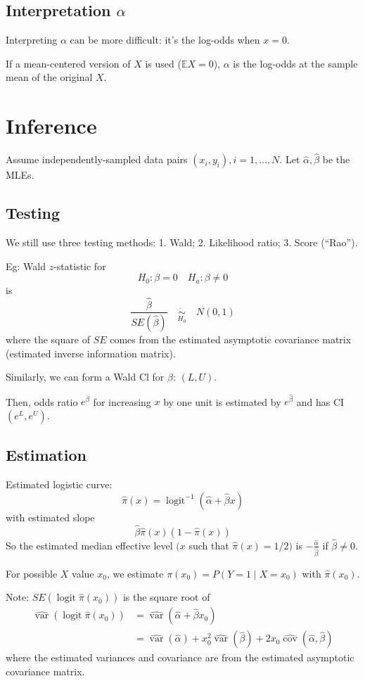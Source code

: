 \documentclass[11pt]{elegantbook}
\begin{document}
\subsection{Interpretation $\alpha$}
Interpreting $\alpha$ can be more difficult: it's the log-odds when $x = 0$.

If a mean-centered version of $X$ is used ($\mathbb{E}X=0$), $\alpha$ is the log-odds at the sample mean of the original $X$.

\section{Inference}
Assume independently-sampled data pairs $(x_i,y_i), i=1,...,N$. Let $\hat{\alpha},\hat{\beta}$ be the MLEs.

\subsection{Testing}
We still use three testing methods: 1. Wald; 2. Likelihood ratio; 3. Score (“Rao”).

Eg: Wald $z$-statistic for
$$
H_0: \beta=0 \quad H_a: \beta \neq 0
$$
is
$$
\frac{\hat{\beta}}{S E(\hat{\beta})}\quad \underset{H_0}{\dot{\sim}}\quad N(0,1)
$$
where the square of $S E$ comes from the estimated asymptotic covariance matrix (estimated inverse information matrix).

Similarly, we can form a Wald $\mathrm{Cl}$ for $\beta$: $(L,U)$.

Then, odds ratio $e^\beta$ for increasing $x$ by one unit is estimated by $e^{\hat{\beta}}$ and has CI $(e^L,e^U)$.

\subsection{Estimation}
Estimated logistic curve:
$$
\hat{\pi}(x)=\operatorname{logit}^{-1}(\hat{\alpha}+\hat{\beta} x)
$$
with estimated slope
$$
\hat{\beta} \hat{\pi}(x)(1-\hat{\pi}(x))
$$
So the estimated median effective level $(x$ such that $\hat{\pi}(x)=1 / 2)$ is $-\frac{\hat{\alpha}}{\hat{\beta}}$ if $\hat{\beta} \neq 0$.

For possible $X$ value $x_0$, we estimate $\pi(x_0)=P(Y=1\mid X=x_0)$ with $\hat{\pi}(x_0)$.

Note: $S E\left(\operatorname{logit} \hat{\pi}\left(x_0\right)\right)$ is the square root of
$$
\begin{aligned}
\widehat{\operatorname{var}}\left(\operatorname{logit} \hat{\pi}\left(x_0\right)\right) & =\widehat{\operatorname{var}}\left(\hat{\alpha}+\hat{\beta} x_0\right) \\
& =\widehat{\operatorname{var}}(\hat{\alpha})+x_0^2 \widehat{\operatorname{var}}(\hat{\beta})+2 x_0 \widehat{\operatorname{cov}}(\hat{\alpha}, \hat{\beta})
\end{aligned}
$$
where the estimated variances and covariance are from the estimated asymptotic covariance matrix.
\end{document}

